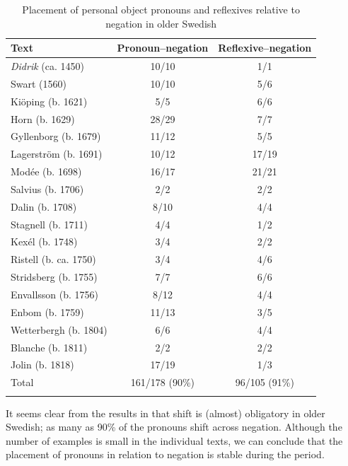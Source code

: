 \documentclass[output=paper]{langscibook}
\begin{document}
\begin{table}
\caption{Placement of personal object pronouns and reflexives relative to negation in older Swedish\label{tab:lalu:4}}
\begin{tabular}{lcc}
\lsptoprule
Text & Pronoun–negation & Reflexive--negation\\
\midrule
\textit{Didrik} (ca. 1450) & 10/10 & 1/1\\
Swart (1560) & 10/10 & 5/6\\
Kiöping (b. 1621) & 5/5 & 6/6\\
Horn (b. 1629) & 28/29 & 7/7\\
Gyllenborg (b. 1679) & 11/12 & 5/5\\
Lagerström (b. 1691) & 10/12 & 17/19\\
Modée (b. 1698) & 16/17 & 21/21\\
Salvius (b. 1706) & 2/2 & 2/2\\
Dalin (b. 1708) & 8/10 & 4/4\\
Stagnell (b. 1711) & 4/4 & 1/2\\
Kexél (b. 1748) & 3/4 & 2/2\\
Ristell (b. ca. 1750) & 3/4 & 4/6\\
Stridsberg (b. 1755) & 7/7 & 6/6\\
Envallsson (b. 1756) & 8/12 & 4/4\\
Enbom (b. 1759) & 11/13 & 3/5\\
Wetterbergh (b. 1804) & 6/6 & 4/4\\
Blanche (b. 1811) & 2/2 & 2/2\\
Jolin (b. 1818) & 17/19 & 1/3\\
\midrule
Total & 161/178 (90\%) & 96/105 (91\%)\\
\lspbottomrule
\end{tabular}
\end{table}

It seems clear from the results in  that  shift is (almost) obligatory in older Swedish; as many as 90\% of the pronouns shift across negation. Although the number of examples is small in the individual texts, we can conclude that the placement of pronouns in relation to negation is stable during the period.
\end{document}
